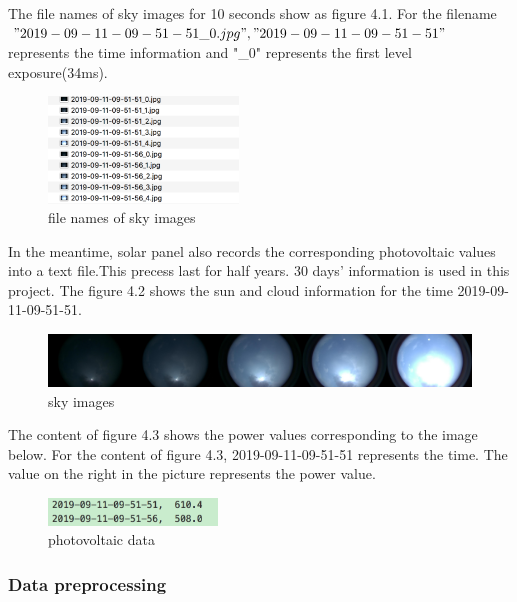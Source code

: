 The file names of sky images for 10 seconds show as figure 4.1. For the filename $"2019-09-11-09-51-51\_0.jpg", "2019-09-11-09-51-51"$ represents the time information and "\_0" represents the first level exposure(34ms).

\begin{figure}[!ht]
	\centering
	\includegraphics[width=0.45\textwidth]{sun_picture_01.png}
	\caption{file names of sky images\label{fig:sun}}
\end{figure}


In the meantime, solar panel also records the corresponding photovoltaic values into a text file.This precess last for half years. 30 days' information is used in this project.
The figure 4.2 shows the sun and cloud information for the time 2019-09-11-09-51-51.

\begin{figure}[!ht]
	\centering
	\includegraphics[width=\textwidth]{sun01.jpg}
	\caption{sky images\label{fig:sun}}
\end{figure}

The content of figure 4.3 shows the power values corresponding to the image below.
For the content of figure 4.3, 2019-09-11-09-51-51 represents the time. The value on the right in the picture represents the power value.

\begin{figure}[!ht]
	\centering
	\includegraphics[width=0.4\textwidth]{irradiance_data.png}
	\caption{photovoltaic data\label{fig:photovoltaic}}
\end{figure}


\subsubsection{Data preprocessing}

